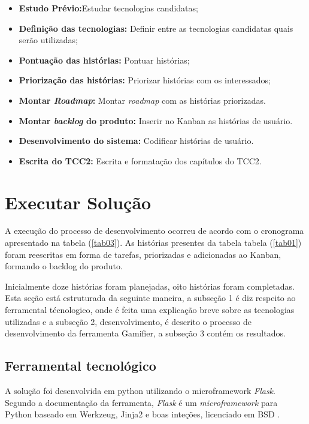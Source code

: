 \begin{itemize}
\item  \textbf {Estudo Prévio:}Estudar tecnologias candidatas;
\item  \textbf {Definição das tecnologias:} Definir entre as tecnologias candidatas quais serão utilizadas;
\item  \textbf {Pontuação das histórias:} Pontuar histórias;
\item  \textbf {Priorização das histórias:} Priorizar histórias com os interessados;
\item  \textbf {Montar \textit{Roadmap}:} Montar \textit{roadmap} com as histórias priorizadas.
\item  \textbf {Montar \textit{backlog} do produto:} Inserir no Kanban as histórias de usuário.
\item  \textbf{Desenvolvimento do sistema:} Codificar histórias de usuário.
\item  \textbf{Escrita do TCC2:} Escrita e formatação dos capítulos do TCC2.
\end{itemize}

\section {Executar Solução}

A execução do processo de desenvolvimento ocorreu de acordo com o cronograma apresentado na tabela (\ref{tab03}). As histórias presentes da  tabela tabela (\ref{tab01}) foram reescritas em forma de tarefas, priorizadas e adicionadas ao Kanban, formando o backlog do produto. 

Inicialmente doze histórias foram planejadas, oito histórias foram completadas.
Esta seção está estruturada da seguinte maneira, a subseção 1 é diz respeito ao ferramental técnologico, onde é feita uma explicação breve sobre as tecnologias utilizadas e a subseção 2, desenvolvimento, é descrito o processo de desenvolvimento da ferramenta Gamifier, a subseção 3 contém os resultados.  

\subsection {Ferramental tecnológico}

A solução foi desenvolvida em python utilizando o microframework \textit{Flask}. Segundo a documentação da ferramenta, \textit{Flask} é um \textit{microframework} para Python baseado em Werkzeug, Jinja2 e boas inteções, licenciado em BSD \cite{flask}. 

